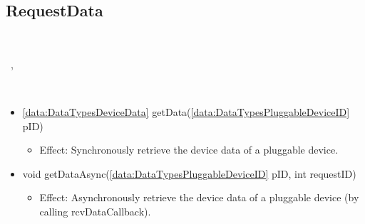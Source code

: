   \subsection{RequestData}\label{int:MoteMoteRequestData}
    \begin{description}
      \item[Provided by:] \iconcomponent{}~
      \item[Required by:] \iconcomponent{}~, \iconcomponent{}~
      \item[Operations:] ~
    \begin{itemize}[noitemsep,nolistsep,leftmargin=-.25cm]
      \item \textsf{\ref{data:DataTypesDeviceData} getData(\ref{data:DataTypesPluggableDeviceID} pID)}
        \begin{itemize}[noitemsep,nolistsep]
           \item Effect: Synchronously retrieve the device data of a pluggable device.
        \end{itemize}
      \item \textsf{void getDataAsync(\ref{data:DataTypesPluggableDeviceID} pID, int requestID)}
        \begin{itemize}[noitemsep,nolistsep]
           \item Effect: Asynchronously retrieve the device data of a pluggable device (by calling rcvDataCallback).
        \end{itemize}
    \end{itemize}
    \end{description}

